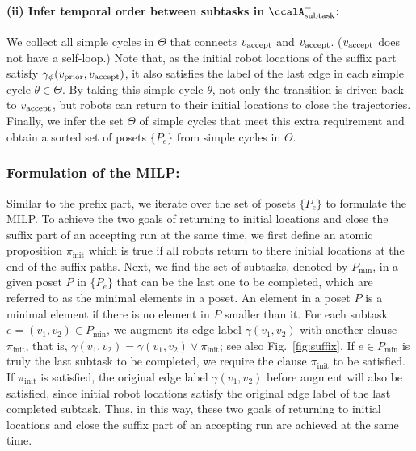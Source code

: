 \documentclass[Afour,sageh,times]{sagej}
\newcommand{\auto}[1]{\ccalA_{\textup{#1}}}
\newcommand{\autop}{\ccalA_{\phi}}
\newcommand{\vertex}[1]{v_{\textup{#1}}}
\newcommand{\ag}[2]{\langle#1,#2\rangle}
\begin{document}
{{{  \paragraph{(ii) Infer temporal order between subtasks in $\auto{subtask}^-$:} We collect all simple cycles in $\Theta$ that connects $\vertex{accept}$ and $\vertex{accept}$. ($\vertex{accept}$ does not have a self-loop.) %
 Note that, as the initial robot locations of the suffix part satisfy $\gamma_{\phi}(\vertex{prior}, \vertex{accept})$, it also satisfies the label of the last edge in each simple cycle $\theta\in \Theta$. By taking this simple cycle $\theta$, not only the transition is driven back to $\vertex{accept}$, but robots can return to their initial locations to close the trajectories. %
 Finally, we infer the set $\Theta$ of simple cycles that meet this extra requirement and  obtain a sorted set of posets $\{P_e\}$ from simple cycles in $\Theta$.

  \subsubsection{Formulation of the MILP:}\label{sec:suf_milp} Similar to the prefix part, we iterate over the set of posets $\{P_e\}$ to formulate the MILP.  To achieve the two goals of returning to initial locations and close the suffix part of an accepting run at the same time, we first define an atomic proposition $\pi_{\text{init}}$ which is true if all robots return to there initial locations at the end of the suffix paths. Next, we find the set of subtasks, denoted by $P_{\text{min}}$, in a given poset $P$ in $\{P_e\}$ that can be the last one to be completed, which are referred to as the minimal elements in a poset. An element in a poset $P$  is a minimal element if there is no element in $P$ smaller than it. %
  For each subtask $e = (v_1, v_2) \in P_{\text{min}}$, we augment its edge label $\gamma(v_1, v_2)$ with another clause $\pi_{\text{init}}$, that is, $\gamma(v_1, v_2) = \gamma(v_1, v_2) \vee \pi_{\text{init}}$; see also Fig.~\ref{fig:suffix}. If $e \in P_{\text{min}}$ is truly the last subtask to be completed, we require the clause $ \pi_{\text{init}}$  to be satisfied. If $\pi_{\text{init}}$ is satisfied, the original edge label $\gamma(v_1, v_2)$ before augment will also be satisfied, since initial robot locations satisfy the original edge label of the last completed subtask. Thus, in this way, these two goals of returning to initial locations and close the suffix part of an accepting run are achieved  at the same time.
}}}
\end{document}
